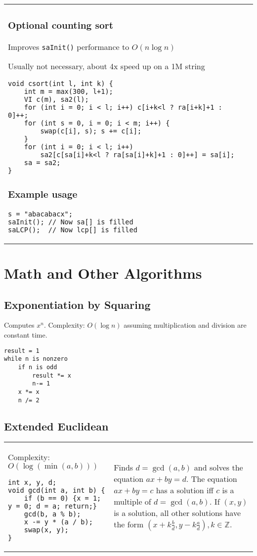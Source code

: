 \documentclass[letterpaper]{article}
\begin{document}
\begin{tabular}{@{}p{9cm}p{9cm}@{}}
\subsubsection{Optional counting sort}
Improves \texttt{saInit()} performance to $O\left(n\log n\right)$

Usually not necessary, about 4x speed up on a 1M string
\begin{lstlisting}
void csort(int l, int k) {
	int m = max(300, l+1);
	VI c(m), sa2(l);
	for (int i = 0; i < l; i++) c[i+k<l ? ra[i+k]+1 : 0]++;
	for (int s = 0, i = 0; i < m; i++) {
		swap(c[i], s); s += c[i];
	}
	for (int i = 0; i < l; i++)
		sa2[c[sa[i]+k<l ? ra[sa[i]+k]+1 : 0]++] = sa[i];
	sa = sa2;
}
\end{lstlisting}
\subsubsection{Example usage}

\begin{lstlisting}
s = "abacabacx";
saInit(); // Now sa[] is filled
saLCP();  // Now lcp[] is filled
\end{lstlisting}

\end{tabular}

\clearpage

\section{Math and Other Algorithms}

\subsection{Exponentiation by Squaring}

Computes $x^n$. Complexity: $O\left(\log n\right)$ assuming multiplication and division are constant time.

\begin{lstlisting}
result = 1
while n is nonzero
	if n is odd
		result *= x
		n-= 1
	x *= x
	n /= 2
\end{lstlisting}

\subsection{Extended Euclidean}

\begin{tabular}{@{}p{9cm}p{9cm}@{}}
Complexity: $O\left(\log\left(\min\left(a,b\right)\right)\right)$

\begin{lstlisting}
int x, y, d;
void gcd(int a, int b) {
	if (b == 0) {x = 1; y = 0; d = a; return;}
	gcd(b, a % b);
	x -= y * (a / b);
	swap(x, y);
}
\end{lstlisting}
&
Finds $d=\gcd(a,b)$ and solves the equation $ax+by=d$. The equation $ax+by=c$ has a solution iff $c$ is a multiple of $d=\gcd(a,b)$. If $(x,y)$ is a solution, all other solutions have the form $(x + k\frac bd, y - k\frac ad), k\in\mathbb Z$.
\end{tabular}
\end{document}
